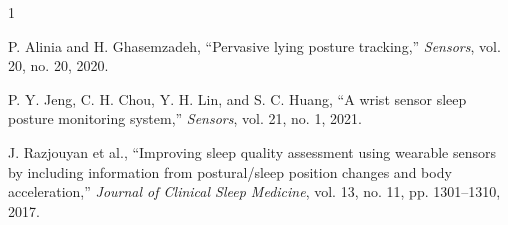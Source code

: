 \documentclass[10pt,journal]{IEEEtran}
\begin{document}
\begin{thebibliography}{1}

P. Alinia and H. Ghasemzadeh, ``Pervasive lying posture tracking,'' \textit{Sensors}, vol. 20, no. 20, 2020.

P. Y. Jeng, C. H. Chou, Y. H. Lin, and S. C. Huang, ``A wrist sensor sleep posture monitoring system,'' \textit{Sensors}, vol. 21, no. 1, 2021.

J. Razjouyan et al., ``Improving sleep quality assessment using wearable sensors by including information from postural/sleep position changes and body acceleration,'' \textit{Journal of Clinical Sleep Medicine}, vol. 13, no. 11, pp. 1301--1310, 2017.

\end{thebibliography}
\end{document}
